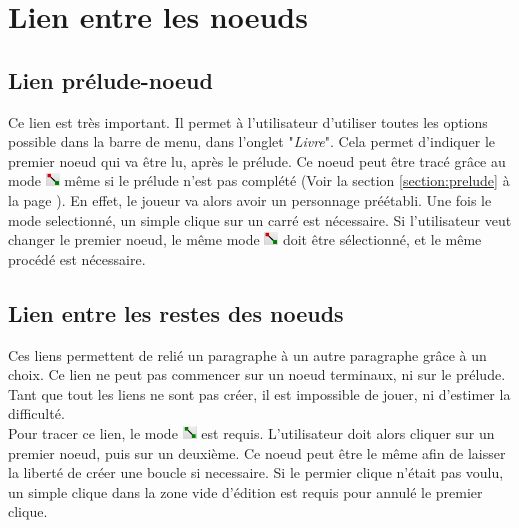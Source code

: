 \chapter{Lien entre les noeuds}

	\section{Lien prélude-noeud}
		Ce lien est très important. Il permet à l'utilisateur d'utiliser toutes les options possible dans la barre de menu, dans l'onglet "\textit{Livre}". Cela permet d'indiquer le premier noeud qui va être lu, après le prélude. Ce noeud peut être tracé grâce au mode \includegraphics[height=10pt]{img/modePreludeNoeud.png} même si le prélude n'est pas complété (Voir la section \ref{section:prelude} à la page \pageref{section:prelude}). En effet, le joueur va alors avoir un personnage préétabli.
		Une fois le mode selectionné, un simple clique sur un carré est nécessaire. Si l'utilisateur veut changer le premier noeud, le même mode \includegraphics[height=10pt]{img/modePreludeNoeud.png} doit être sélectionné, et le même procédé est nécessaire.

	\section{Lien entre les restes des noeuds}
		Ces liens permettent de relié un paragraphe à un autre paragraphe grâce à un choix. Ce lien ne peut pas commencer sur un noeud terminaux, ni sur le prélude. Tant que tout les liens ne sont pas créer, il est impossible de jouer, ni d'estimer la difficulté.\\

		Pour tracer ce lien, le mode \includegraphics[height=10pt]{img/modeLien.png} est requis. L'utilisateur doit alors cliquer sur un premier noeud, puis sur un deuxième. Ce noeud peut être le même afin de laisser la liberté de créer une boucle si necessaire.
		Si le permier clique n'était pas voulu, un simple clique dans la zone vide d'édition est requis pour annulé le premier clique.\\

